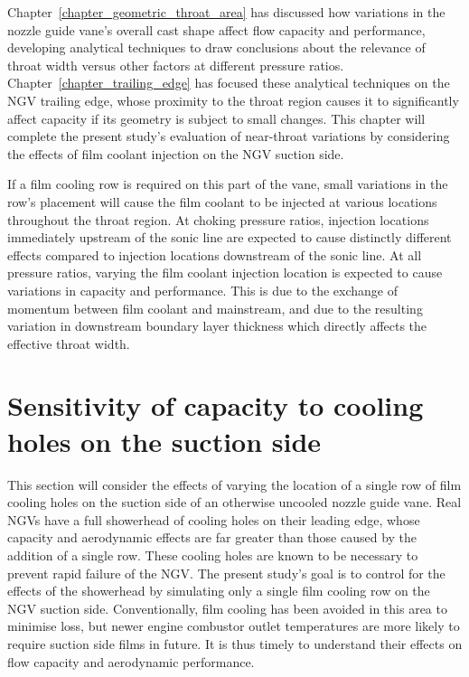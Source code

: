 \documentclass[a4paper, 11pt, oneside]{report}
\begin{document}
Chapter~\ref{chapter_geometric_throat_area} has discussed how variations in the nozzle guide vane's overall cast shape affect flow capacity and performance, developing analytical techniques to draw conclusions about the relevance of throat width versus other factors at different pressure ratios. Chapter~\ref{chapter_trailing_edge} has focused these analytical techniques on the NGV trailing edge, whose proximity to the throat region causes it to significantly affect capacity if its geometry is subject to small changes. This chapter will complete the present study's evaluation of near-throat variations by considering the effects of film coolant injection on the NGV suction side. 

If a film cooling row is required on this part of the vane, small variations in the row's placement will cause the film coolant to be injected at various locations throughout the throat region. At choking pressure ratios, injection locations immediately upstream of the sonic line are expected to cause distinctly different effects compared to injection locations downstream of the sonic line. At all pressure ratios, varying the film coolant injection location is expected to cause variations in capacity and performance. This is due to the exchange of momentum between film coolant and mainstream, and due to the resulting variation in downstream boundary layer thickness which directly affects the effective throat width.


\section{Sensitivity of capacity to cooling holes on the suction side}
\label{sensitivity_of_capacity_to_cooling_holes_on_the_leading_suction_side}

This section will consider the effects of varying the location of a single row of film cooling holes on the suction side of an otherwise uncooled nozzle guide vane. Real NGVs have a full showerhead of cooling holes on their leading edge, whose capacity and aerodynamic effects are far greater than those caused by the addition of a single row. These cooling holes are known to be necessary to prevent rapid failure of the NGV. The present study's goal is to control for the effects of the showerhead by simulating only a single film cooling row on the NGV suction side. Conventionally, film cooling has been avoided in this area to minimise loss, but newer engine combustor outlet temperatures are more likely to require suction side films in future. It is thus timely to understand their effects on flow capacity and aerodynamic performance. 
\end{document}
